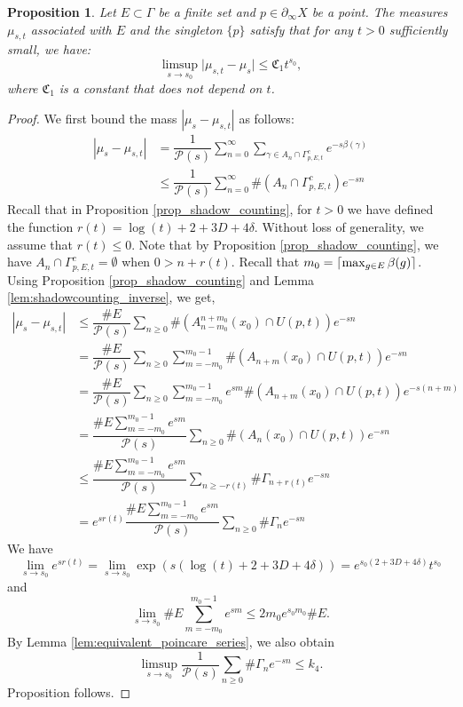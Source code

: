 \documentclass[12pt]{amsbook}%
\newtheorem{prop}[thm]{Proposition}
\theoremstyle{definition}
\theoremstyle{remark}
\numberwithin{section}{chapter}
\numberwithin{subsection}{section}
\numberwithin{figure}{chapter}
\def\cP{{\mathscr{P}}}
\def\fC{{\mathfrak{C}}}
\def\geo{\partial_\infty}
\DeclarePairedDelimiter\ceil{\lceil}{\rceil}
\def\kap{}
\begin{document}
{{\begin{prop} \label{prop:control_must_singlepoint} Let  $E\subset \Gamma$ be a finite set and $p\in \geo X$ be a point. 
The measures $\mu_{s,t}$ associated with $E$ and the singleton $\{p\}$ satisfy that for any $t>0$ sufficiently small, we have:
$$%
\limsup_{s \rightarrow s_0}\vert \mu_{s,t}-\mu_{s}\vert \leqslant \fC_1 t^{s_0},  
$$%
where $\fC_1$ is a constant that does not depend on $t$.
\end{prop}
\begin{proof}
We first bound the mass $|\mu_s - \mu_{s,t}|$ as follows: 
\begin{align*}
|\mu_s - \mu_{s,t}| & =  \dfrac{1}{\cP(s)} \sum_{n=0}^\infty \sum_{\gamma \in A_n \cap \Gamma_{p,E,t}^c} e^{-s\beta(\gamma)} \\
   & \leqslant \dfrac{1}{\cP(s)} \sum_{n=0}^\infty  \# (A_n \cap \Gamma_{p,E,t}^c) e^{-sn} 
\end{align*}
Recall that in Proposition \ref{prop_shadow_counting}, for $t > 0$ we have defined the function $r(t)= \log(t)+2+3D+4\delta$. 
Without loss of generality, we assume that $r(t)\leqslant 0$. Note that by Proposition \ref{prop_shadow_counting}, we have 
$A_n \cap \Gamma_{p,E,t}^c=\emptyset$ when $0>n+r(t)$. Recall that $m_0=\ceil{\max_{g\in E}\beta(g)}$. 
Using Proposition \ref{prop_shadow_counting} and Lemma \ref{lem:shadowcounting_inverse}, we get, 
\begin{align*}
|\mu_s - \mu_{s,t}| 	&\leqslant \dfrac{\#E }{\cP(s)} \sum_{n\geqslant 0}\# \left(A_{n-m_0}^{n+m_0}(x_0)\cap U(p,t) \right) e^{-s n}\\
&= \dfrac{\#E }{\cP(s)} \sum_{n\geqslant 0}\sum_{m=-m_0}^{m_0-1}\# \left(A_{n+m}(x_0)\cap U(p,t) \right) e^{-s n}\\
&= \dfrac{\#E }{\cP(s)} \sum_{n\geqslant 0}\sum_{m=-m_0}^{m_0-1}e^{sm}\# \left(A_{n+m}(x_0)\cap U(p,t) \right) e^{-s (n+m)}\\
&= \dfrac{\#E\sum_{m=-m_0}^{m_0-1}e^{sm} }{\cP(s)} \sum_{n\geqslant 0}\# \left(A_n(x_0)\cap U(p,t) \right) e^{-s n}\\
&\leqslant \dfrac{\#E\sum_{m=-m_0}^{m_0-1}e^{sm}}{\cP(s)} \sum_{n\geqslant -r(t)} \# \Gamma_{n+r(t)} e^{-s n}\\
&= e^{sr(t)}\dfrac{\#E\sum_{m=-m_0}^{m_0-1}e^{sm}}{\cP(s)} \sum_{n\geqslant 0} \# \Gamma_{n} e^{-s n}
\end{align*}
We have  
$$
\lim_{s\to s_0} e^{sr(t)}= \lim_{s\to s_0} \exp(s(\log(t)+2+3D+4\delta))= e^{s_0(2+3D+4\delta)} t^{s_0}$$
and
$$
\lim_{s\to s_0}  \#E\sum_{m=-m_0}^{m_0-1}e^{sm} \leqslant 2m_0e^{s_0 m_0} \#E .
$$
By 
Lemma \ref{lem:equivalent_poincare_series}, we also obtain
$$
\limsup_{s\to s_0} \frac{1}{\cP(s)}   \sum_{n\geqslant 0} \# \Gamma_{n} e^{-s n}\leqslant k_4.  
$$
Proposition follows. 
\end{proof}


}}
\end{document}
